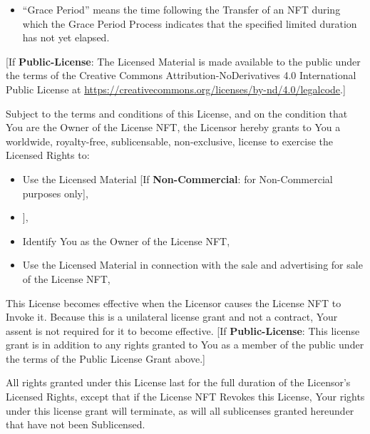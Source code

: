 \documentclass{article}
\newcommand{\keyword}[1]{\textbf{#1}\xspace}
\newcommand{\publiclicense}{\keyword{Public-License}}
\newcommand{\noncommercial}{\keyword{Non-Commercial}}
\newcommand{\noderivative}{\keyword{No-Derivatives}}
\newcommand{\derivativetracking}{\keyword{Derivatives-NFT}}
\newcommand{\sharealike}{\keyword{Derivatives-NFT-Share-Alike}}
\newcommand{\sect}[1]{\vspace{12pt}\noindent{\strong{#1}}}
\newcommand{\iflicenseoption}[2]{[\colorbox{light-gray}{If #1:} #2]}
\newcommand{\ifnotlicenseoption}[2]{[\colorbox{light-gray}{Unless #1:} #2]}
\begin{document}
\begin{sffamily}
\begin{itemize}
	\item ``Grace Period'' means the time following the Transfer of an NFT during which the Grace Period Process indicates that the specified limited duration has not yet elapsed.
	
	\end{itemize}


\sect{Public License Grant}

\iflicenseoption{\publiclicense}{The Licensed Material is made available to the public under the terms of the Creative Commons Attribution-NoDerivatives 4.0 International Public License at \href{https://creativecommons.org/licenses/by-nd/4.0/legalcode}{https://creativecommons.org/licenses/by-nd/4.0/legalcode}.}

\sect{NFT License Grant}

Subject to the terms and conditions of this License, and on the condition that You are the Owner of the License NFT, the Licensor hereby grants to You a worldwide, royalty-free, sublicensable, non-exclusive, license to exercise the Licensed Rights to:
\begin{itemize}
\item Use the Licensed Material \iflicenseoption{\noncommercial}{for Non-Commercial purposes only},
\item \ifnotlicenseoption{\noderivative}{Create and Use Adapted Material \iflicenseoption{\noncommercial}{for Non-Commercial purposes only} \iflicenseoption{\derivativetracking}{provided that the Adapted Material is Derivative Tracked from the License NFT} \iflicenseoption{\sharealike}{provided that the Adapted Material is Share-Alike Sublicensed from the License NFT}},
\item Identify You as the Owner of the License NFT,
\item Use the Licensed Material in connection with the sale and advertising for sale of the License NFT,
\end{itemize}
This License becomes effective when the Licensor causes the License NFT to Invoke it. Because this is a unilateral license grant and not a contract, Your assent is not required for it to become effective. \iflicenseoption{\publiclicense}{This license grant is in addition to any rights granted to You as a member of the public under the terms of the Public License Grant above.}

All rights granted under this License last for the full duration of the Licensor's Licensed Rights, except that if the License NFT Revokes this License, Your rights under this license grant will terminate, as will all sublicenses granted hereunder that have not been Sublicensed.


\end{sffamily}
\end{document}
